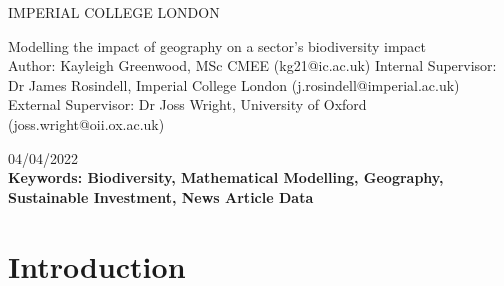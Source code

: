\documentclass[11pt, a4paper, titlepage]{article}
\begin{document}
    \begin{titlepage}
    \begin{center}
            {\large IMPERIAL COLLEGE LONDON}
    \end{center}
    
    \vspace*{\fill}
    
    \begin{center}
        {\Huge Modelling the impact of geography on a sector's biodiversity impact}
        \\[2in]
        Author: Kayleigh Greenwood, MSc CMEE (kg21@ic.ac.uk)
        \bigskip
        \newline
       Internal Supervisor: Dr James Rosindell, Imperial College London (j.rosindell@imperial.ac.uk)
       \bigskip
       \newline
        External Supervisor: Dr Joss Wright, University of Oxford (joss.wright@oii.ox.ac.uk)
        \bigskip
        \newline

        04/04/2022
        \\[2in]
        
        {\bfseries Keywords: Biodiversity, Mathematical Modelling, Geography, Sustainable Investment, News Article Data }

        

    \end{center}
    
    \vspace{\fill}
    
    \end{titlepage}

    \section*{Introduction}
    
\end{document}
